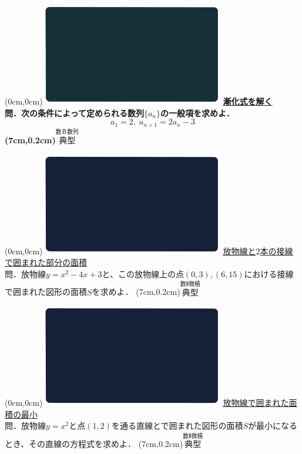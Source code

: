 \documentclass[10pt,
fleqn,
dvipdfmx,
uplatex
]{jsarticle}
\begin{document}
\newpage

\at(0cm,0cm){\includegraphics[width=8cm,bb=0 0 1920 1080]{./youtube/thumbnails/templates/smart_background/数B数列.jpeg}}
{\color{orange}\bf\boldmath\Large\underline{漸化式を解く}}\vspace{0.3zw}\\
\large 
\bf\boldmath 問．次の条件によって定められる数列$\{a_n\}$の一般項を求めよ．
\[a_1=2,\;a_{n+1}=2a_n-3\]
\at(7cm,0.2cm){\small\color{bradorange}$\overset{\text{数Ｂ数列}}{\text{典型}}$}

\newpage



\bf\boldmath

\at(0cm,0cm){\includegraphics[width=8cm,bb=0 0 1920 1080]{./youtube/thumbnails/templates/smart_background/数II微積.jpeg}}
{\color{orange}\normalsize\underline{放物線と$2$本の接線で囲まれた部分の面積}}\vspace{0.3zw}\\
\Large
問．放物線$y=x^2-4x+3$と、この放物線上の点$\left(0,3\right),\left(6,{15}\right)$における接線で囲まれた図形の面積$S$を求めよ．
\at(7cm,0.2cm){\small\color{bradorange}$\overset{\text{数Ⅱ微積}}{\text{典型}}$}

\newpage

\at(0cm,0cm){\includegraphics[width=8cm,bb=0 0 1920 1080]{./youtube/thumbnails/templates/smart_background/数II微積.jpeg}}
{\color{orange}\Large\underline{放物線で囲まれた面積の最小}}\vspace{0.3zw}\\
\Large
問．放物線$y=x^2$と点$\left(1,2\right)$を通る直線とで囲まれた図形の面積$S$が最小になるとき、その直線の方程式を求めよ．
\at(7cm,0.2cm){\small\color{bradorange}$\overset{\text{数Ⅱ微積}}{\text{典型}}$}
\end{document}
